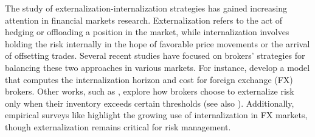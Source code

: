 \documentclass[10pt]{article}
\begin{document}
The study of externalization-internalization strategies has gained increasing attention in financial markets research. Externalization refers to the act of hedging or offloading a position in the market, while internalization involves holding the risk internally in the hope of favorable price movements or the arrival of offsetting trades. Several recent studies have focused on brokers’ strategies for balancing these two approaches in various markets. For instance, \citeauthor{butz2019internalisation} \cite{butz2019internalisation} develop a model that computes the internalization horizon and cost for foreign exchange (FX) brokers. Other works, such as \citeauthor{barzykin2021algorithmic} \cite{barzykin2021algorithmic,barzykin2022market}, explore how brokers choose to externalize risk only when their inventory exceeds certain thresholds (see also \citeauthor{barzykin2022dealing} \cite{barzykin2022dealing, barzykin2024market}). Additionally, empirical surveys like \citeauthor{schrimpf2019fx} \cite{schrimpf2019fx} highlight the growing use of internalization in FX markets, though externalization remains critical for risk management.\\
\end{document}
